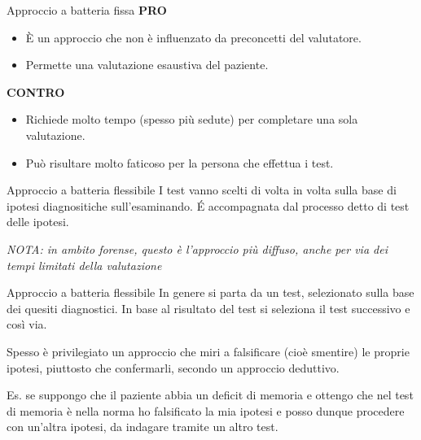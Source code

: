 \documentclass[
  ignorenonframetext,
]{beamer}
\providecommand{\tightlist}{%
  \setlength{\itemsep}{0pt}\setlength{\parskip}{0pt}}
\begin{document}
\begin{frame}{Approccio a batteria fissa}
\label{approccio-a-batteria-fissa-1}
\textbf{PRO}

\begin{itemize}
\tightlist
\item
  È un approccio che non è influenzato da preconcetti del valutatore.
\item
  Permette una valutazione esaustiva del paziente.
\end{itemize}

\textbf{CONTRO}

\begin{itemize}
\tightlist
\item
  Richiede molto tempo (spesso più sedute) per completare una sola
  valutazione.
\item
  Può risultare molto faticoso per la persona che effettua i test.
\end{itemize}
\end{frame}

\begin{frame}{Approccio a batteria flessibile}
\label{approccio-a-batteria-flessibile}
I test vanno scelti di volta in volta sulla base di ipotesi
diagnositiche sull'esaminando. É accompagnata dal processo detto di test
delle ipotesi.

\emph{NOTA: in ambito forense, questo è l'approccio più diffuso, anche
per via dei tempi limitati della valutazione}
\end{frame}

\begin{frame}{Approccio a batteria flessibile}
\label{approccio-a-batteria-flessibile-1}
In genere si parta da un test, selezionato sulla base dei quesiti
diagnostici. In base al risultato del test si seleziona il test
successivo e così via.

Spesso è privilegiato un approccio che miri a falsificare (cioè
smentire) le proprie ipotesi, piuttosto che confermarli, secondo un
approccio deduttivo.

Es. se suppongo che il paziente abbia un deficit di memoria e ottengo
che nel test di memoria è nella norma ho falsificato la mia ipotesi e
posso dunque procedere con un'altra ipotesi, da indagare tramite un
altro test.
\end{frame}
\end{document}
